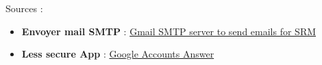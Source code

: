 \bigskip

Sources :

\begin{itemize}
    \item \textbf{Envoyer mail SMTP} : \href{https://kb.synology.com/fr-fr/SRM/tutorial/How_to_use_Gmail_SMTP_server_to_send_emails_for_SRM}{Gmail SMTP server to send emails for SRM}
    \item \textbf{Less secure App} : \href{https://support.google.com/accounts/answer/6010255?sjid=6174101903992956370-EU}{Google Accounts Answer}
\end{itemize}

\bigskip



\bigskip

